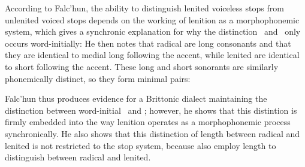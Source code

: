 According to Falc'hun, the ability to distinguish lenited voiceless stops from unlenited voiced stops depends on the working of lenition as a morphophonemic system, which gives a synchronic explanation for why the distinction \lT\ and \xD\ only occurs word-initially:
He then notes that radical  are long consonants and that they are identical to medial long  following the accent, while lenited  are identical to short  following the accent. These long and short sonorants are similarly phonemically distinct, so they form minimal pairs:
\begin{mwl}
\end{mwl}
Falc'hun thus produces evidence for a Brittonic dialect maintaining the distinction between word-initial \lT\ and \xD; however, he shows that this distintion is firmly embedded into the way lenition operates as a morphophonemic process synchronically. He also shows that this distinction of length between radical and lenited is not restricted to the stop system, because  also employ length to distinguish between radical and lenited.


